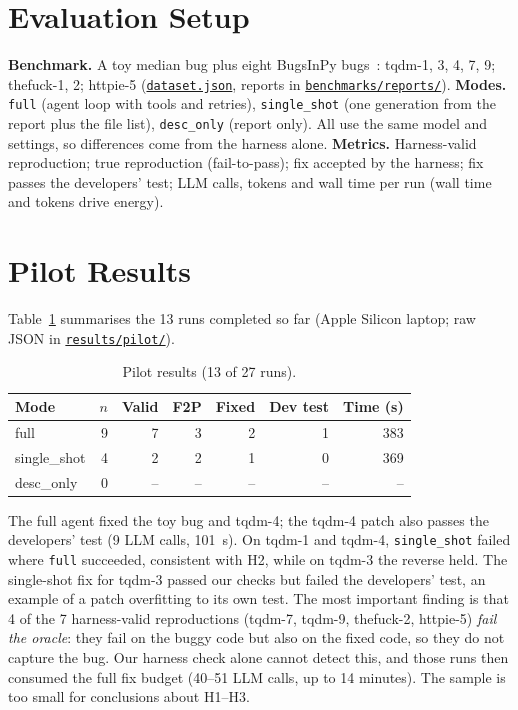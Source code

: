 \documentclass[manuscript,screen,nonacm]{acmart}
\newcommand{\repo}{https://github.com/keshavdubeyy/reproagent_autose}
\newcommand{\rlink}[2]{\href{\repo/blob/main/#1}{#2}}
\begin{document}
\section{Evaluation Setup}
\textbf{Benchmark.} A toy median bug plus eight BugsInPy bugs~\cite{bugsinpy}: tqdm-1, 3, 4, 7, 9; thefuck-1, 2; httpie-5
(\rlink{benchmarks/dataset.json}{\texttt{dataset.json}}, reports in \rlink{benchmarks/reports}{\texttt{benchmarks/reports/}}).
\textbf{Modes.} \texttt{full} (agent loop with tools and retries), \texttt{single\_shot} (one generation from the report plus the file list),
\texttt{desc\_only} (report only). All use the same model and settings, so differences come from the harness alone.
\textbf{Metrics.} Harness-valid reproduction; true reproduction (fail-to-pass); fix accepted by the harness;
fix passes the developers' test; LLM calls, tokens and wall time per run (wall time and tokens drive energy).

\section{Pilot Results}
Table~\ref{tab:pilot} summarises the 13 runs completed so far (Apple Silicon laptop; raw JSON in \rlink{results/pilot}{\texttt{results/pilot/}}).

\begin{table}[t]
\caption{Pilot results (13 of 27 runs).}
\label{tab:pilot}
\small
\begin{tabular}{@{}lrrrrrr@{}}
\toprule
Mode & $n$ & Valid & F2P & Fixed & Dev test & Time (s) \\
\midrule
full & 9 & 7 & 3 & 2 & 1 & 383 \\
single\_shot & 4 & 2 & 2 & 1 & 0 & 369 \\
desc\_only & 0 & -- & -- & -- & -- & -- \\
\bottomrule
\end{tabular}
\end{table}

The full agent fixed the toy bug and tqdm-4; the tqdm-4 patch also passes the developers' test (9 LLM calls, 101~s).
On tqdm-1 and tqdm-4, \texttt{single\_shot} failed where \texttt{full} succeeded, consistent with H2, while on tqdm-3 the reverse held.
The single-shot fix for tqdm-3 passed our checks but failed the developers' test, an example of a patch overfitting to its own test.
The most important finding is that 4 of the 7 harness-valid reproductions (tqdm-7, tqdm-9, thefuck-2, httpie-5) \emph{fail the oracle}:
they fail on the buggy code but also on the fixed code, so they do not capture the bug. Our harness check alone cannot detect this,
and those runs then consumed the full fix budget (40--51 LLM calls, up to 14 minutes). The sample is too small for conclusions about H1--H3.
\end{document}
